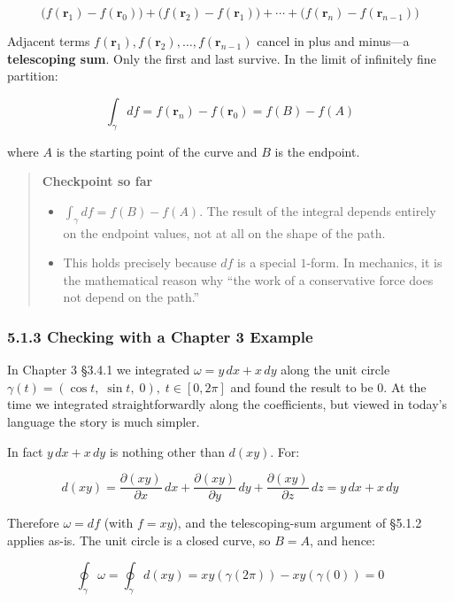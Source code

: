\[\bigl(f(\mathbf{r}_1)-f(\mathbf{r}_0)\bigr) + \bigl(f(\mathbf{r}_2)-f(\mathbf{r}_1)\bigr) + \cdots + \bigl(f(\mathbf{r}_n)-f(\mathbf{r}_{n-1})\bigr)\]

Adjacent terms
\(f(\mathbf{r}_1), f(\mathbf{r}_2), \dots, f(\mathbf{r}_{n-1})\) cancel
in plus and minus---a \textbf{telescoping sum}. Only the first and last
survive. In the limit of infinitely fine partition:

\[\int_\gamma df = f(\mathbf{r}_n) - f(\mathbf{r}_0) = f(B) - f(A)\]

where \(A\) is the starting point of the curve and \(B\) is the
endpoint.

\begin{quote}
\textbf{Checkpoint so far}

\begin{itemize}
\item
  \(\int_\gamma df = f(B) - f(A)\). The result of the integral depends
  entirely on the endpoint values, not at all on the shape of the path.
\item
  This holds precisely because \(df\) is a special \(1\)-form. In
  mechanics, it is the mathematical reason why ``the work of a
  conservative force does not depend on the path.''
\end{itemize}
\end{quote}

\hypertarget{checking-with-a-chapter-3-example}{%
\subsubsection{5.1.3 Checking with a Chapter 3
Example}\label{checking-with-a-chapter-3-example}}

In Chapter 3 §3.4.1 we integrated \(\omega = y\,dx + x\,dy\) along the
unit circle \(\gamma(t) = (\cos t,\; \sin t,\; 0),\; t \in [0,2\pi]\)
and found the result to be \(0\). At the time we integrated
straightforwardly along the coefficients, but viewed in today's language
the story is much simpler.

In fact \(y\,dx + x\,dy\) is nothing other than \(d(xy)\). For:

\[d(xy) = \frac{\partial (xy)}{\partial x}\,dx + \frac{\partial (xy)}{\partial y}\,dy + \frac{\partial (xy)}{\partial z}\,dz = y\,dx + x\,dy\]

Therefore \(\omega = df\) (with \(f = xy\)), and the telescoping-sum
argument of §5.1.2 applies as-is. The unit circle is a closed curve, so
\(B = A\), and hence:

\[\oint_\gamma \omega = \oint_\gamma d(xy) = xy(\gamma(2\pi))-xy(\gamma(0))=0\]

